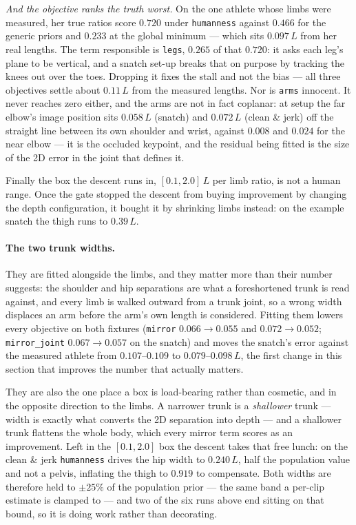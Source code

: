 \documentclass[10pt,a4paper]{article}
\newcommand{\Lt}{L}                      %
\begin{document}
\emph{And the objective ranks the truth worst.} On the one athlete whose limbs
were measured, her true ratios score $0.720$ under \texttt{humanness} against
$0.466$ for the generic priors and $0.233$ at the global minimum --- which sits
$0.097\,\Lt$ from her real lengths. The term responsible is \texttt{legs},
$0.265$ of that $0.720$: it asks each leg's plane to be vertical, and a snatch
set-up breaks that on purpose by tracking the knees out over the toes. Dropping
it fixes the stall and not the bias --- all three objectives settle about
$0.11\,\Lt$ from the measured lengths. Nor is \texttt{arms} innocent. It never
reaches zero either, and the arms are not in fact coplanar: at setup the far
elbow's image position sits $0.058\,\Lt$ (snatch) and $0.072\,\Lt$ (clean \&
jerk) off the straight line between its own shoulder and wrist, against
$0.008$ and $0.024$ for the near elbow --- it is the occluded keypoint, and the
residual being fitted is the size of the 2D error in the joint that defines it.

Finally the box the descent runs in, $[0.1,2.0]\,\Lt$ per limb ratio, is not a
human range. Once the gate stopped the descent from buying improvement by
changing the depth configuration, it bought it by shrinking limbs instead: on
the example snatch the thigh runs to $0.39\,\Lt$.

\paragraph{The two trunk widths.} They are fitted alongside the limbs, and they
matter more than their number suggests: the shoulder and hip separations are
what a foreshortened trunk is read against, and every limb is walked outward
from a trunk joint, so a wrong width displaces an arm before the arm's own
length is considered. Fitting them lowers every objective on both fixtures
(\texttt{mirror} $0.066\to0.055$ and $0.072\to0.052$; \texttt{mirror\_joint}
$0.067\to0.057$ on the snatch) and moves the snatch's error against the
measured athlete from $0.107$--$0.109$ to $0.079$--$0.098\,\Lt$, the first
change in this section that improves the number that actually matters.

They are also the one place a box is load-bearing rather than cosmetic, and in
the opposite direction to the limbs. A narrower trunk is a \emph{shallower}
trunk --- width is exactly what converts the 2D separation into depth --- and a
shallower trunk flattens the whole body, which every mirror term scores as an
improvement. Left in the $[0.1,2.0]$ box the descent takes that free lunch: on
the clean \& jerk \texttt{humanness} drives the hip width to $0.240\,\Lt$, half
the population value and not a pelvis, inflating the thigh to $0.919$ to
compensate. Both widths are therefore held to $\pm25\%$ of the population prior
--- the same band a per-clip estimate is clamped to --- and two of the six runs
above end sitting on that bound, so it is doing work rather than decorating.
\end{document}
